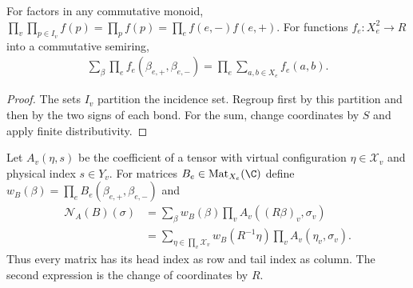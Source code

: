 \begin{lemma}%
    \label{thm:peps_dependent_incidence_sums}
    \leanok
    For factors in any commutative monoid,
    $\prod_v\prod_{p\in I_v}f(p)=\prod_p f(p)
        =\prod_e f(e,-)f(e,+)$. For functions $f_e:X_e^2\to R$ into a
    commutative semiring,
    \begin{align}
        \sum_\beta\prod_e f_e(\beta_{e,+},\beta_{e,-})
        =\prod_e\sum_{a,b\in X_e}f_e(a,b).
        \label{eq:peps_dependent_incidence_sum}
    \end{align}
\end{lemma}
\begin{proof}\leanok
    The sets $I_v$ partition the incidence set. Regroup first by this
    partition and then by the two signs of each bond. For the sum, change
    coordinates by $S$ and apply finite distributivity.
\end{proof}

\begin{definition}%
    \label{def:peps_dependent_network}
    \leanok
    Let $A_v(\eta,s)$ be the coefficient of a tensor with virtual
    configuration $\eta\in\mathcal X_v$ and physical index $s\in Y_v$.
    For matrices $B_e\in\operatorname{Mat}_{X_e}(\C)$ define
    $w_B(\beta)=\prod_e B_e(\beta_{e,+},\beta_{e,-})$ and
    \begin{align}
        \mathcal N_A(B)(\sigma)
         & =\sum_\beta w_B(\beta)\prod_v A_v((R\beta)_v,\sigma_v)
        \label{eq:peps_dependent_network}                         \\
         & =\sum_{\eta\in\prod_v\mathcal X_v}
        w_B(R^{-1}\eta)\prod_v A_v(\eta_v,\sigma_v).\nonumber
    \end{align}
    Thus every matrix has its head index as row and tail index as column.
    The second expression is the change of coordinates by $R$.
\end{definition}

